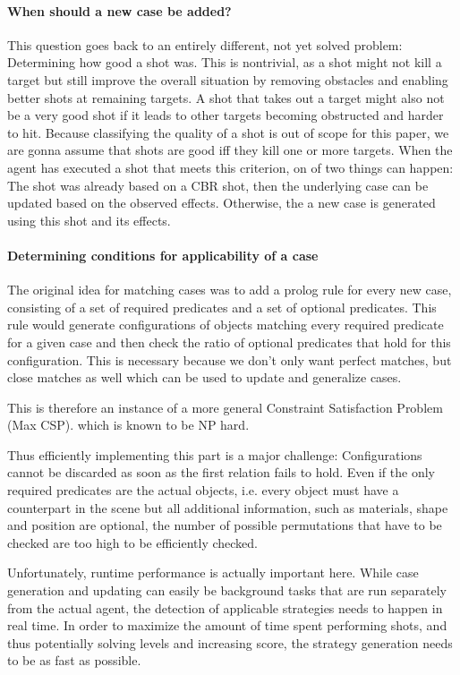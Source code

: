 
\paragraph{When should a new case be added?}
This question goes back to an entirely different, not yet solved problem: Determining how good a shot was.
This is nontrivial, as a shot might not kill a target but still improve the overall situation by removing obstacles and enabling better shots at remaining targets.
A shot that takes out a target might also not be a very good shot if it leads to other targets becoming obstructed and harder to hit.
Because classifying the quality of a shot is out of scope for this paper, we are gonna assume that shots are good iff they kill one or more targets.
When the agent has executed a shot that meets this criterion, on of two things can happen: The shot was already based on a CBR shot, then the underlying case can be updated based on the observed effects. Otherwise, the a new case is generated using this shot and its effects.

\paragraph{Determining conditions for applicability of a case}
The original idea for matching cases was to add a prolog rule for every new case, consisting of a set of required predicates and a set of optional predicates.
This rule would generate configurations of objects matching every required predicate for a given case and then check the ratio of optional predicates that hold for this configuration.
This is necessary because we don't only want perfect matches, but close matches as well which can be used to update and generalize cases.

This is therefore an instance of a more general Constraint Satisfaction Problem (Max CSP). which is known to be NP hard.

Thus efficiently implementing this part is a major challenge:
Configurations cannot be discarded as soon as the first relation fails to hold.
Even if the only required predicates are the actual objects, i.e. every object must have a counterpart in the scene but all additional information, such as materials, shape and position are optional, the number of possible permutations that have to be checked are too high to be efficiently checked.

Unfortunately, runtime performance is actually important here. While case generation and updating can easily be background tasks that are run separately from the actual agent, the detection of applicable strategies needs to happen in real time.
In order to maximize the amount of time spent performing shots, and thus potentially solving levels and increasing score, the strategy generation needs to be as fast as possible.

